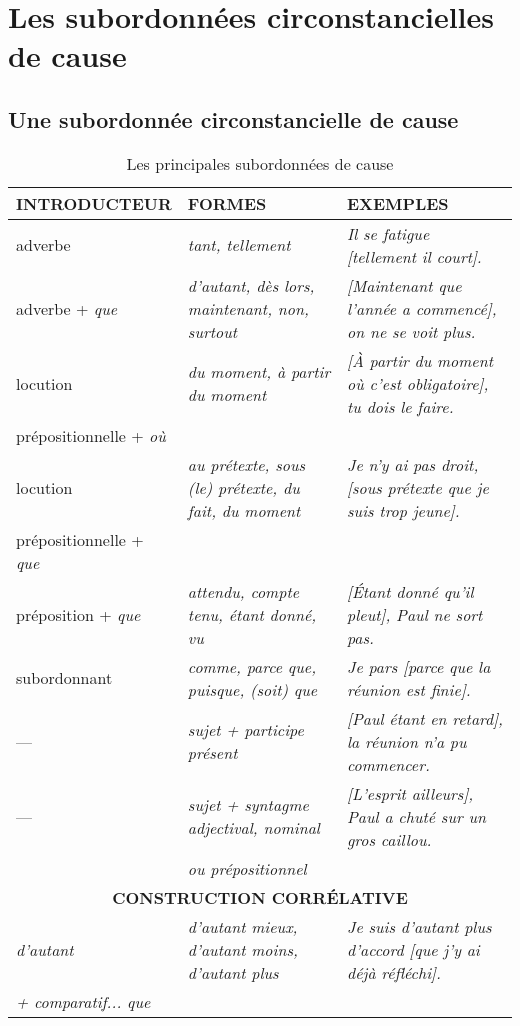 \documentclass[UTF8]{report}
\begin{document}
\section{Les subordonnées circonstancielles de cause}

\subsection{Une subordonnée circonstancielle de cause}

\begin{table}[H]
    \centering
    \small
    
    \begin{adjustbox}{max width =\textwidth}
        \begin{tabular}{|l|l|l|}
        \hline
        \rowcolor{cyan!20}
        \textbf{INTRODUCTEUR} & \textbf{FORMES} & \textbf{EXEMPLES} \\
        \hline
        adverbe & \textit{tant, tellement} & \textit{Il se fatigue [tellement il court].} \\
        \hline
        adverbe + \textit{que} & \textit{d'autant, dès lors, maintenant, non, surtout} & \textit{[Maintenant que l'année a commencé], on ne se voit plus.} \\
        \hline
        locution & \textit{du moment, à partir du moment} & \textit{[À partir du moment où c'est obligatoire], tu dois le faire.} \\
        prépositionnelle + \textit{où} & & \\
        \hline
        locution & \textit{au prétexte, sous (le) prétexte, du fait, du moment} & \textit{Je n'y ai pas droit, [sous prétexte que je suis trop jeune].} \\
        prépositionnelle + \textit{que} & & \\
        \hline
        préposition + \textit{que} & \textit{attendu, compte tenu, étant donné, vu} & \textit{[Étant donné qu'il pleut], Paul ne sort pas.} \\
        \hline
        subordonnant & \textit{comme, parce que, puisque, (soit) que} & \textit{Je pars [parce que la réunion est finie].} \\
        \hline
        --- & \textit{sujet + participe présent} & \textit{[Paul étant en retard], la réunion n'a pu commencer.} \\
        \hline
        --- & \textit{sujet + syntagme adjectival, nominal} & \textit{[L'esprit ailleurs], Paul a chuté sur un gros caillou.} \\
        & \textit{ou prépositionnel} & \\
        \hline
        \multicolumn{3}{|c|}{\textbf{CONSTRUCTION CORRÉLATIVE}} \\
        \hline
        \textit{d'autant} & \textit{d'autant mieux, d'autant moins, d'autant plus} & \textit{Je suis d'autant plus d'accord [que j'y ai déjà réfléchi].} \\
        \textit{+ comparatif... que} & & \\
        \hline
        \end{tabular}
    \end{adjustbox}
    \caption{Les principales subordonnées de cause}
\end{table}
\end{document}
